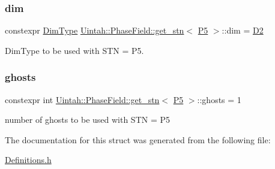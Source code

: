 \subsubsection{\texorpdfstring{dim}{dim}}
{\footnotesize\ttfamily constexpr \hyperlink{namespaceUintah_1_1PhaseField_a12bfc68444894dffdf0cb8d9cf0cc76a}{Dim\+Type} \hyperlink{structUintah_1_1PhaseField_1_1get__stn}{Uintah\+::\+Phase\+Field\+::get\+\_\+stn}$<$ \hyperlink{namespaceUintah_1_1PhaseField_a24d833a720598df1020f5cc2e75f8702a218e7fca21085b602c79158a04bc83a0}{P5} $>$\+::dim = \hyperlink{namespaceUintah_1_1PhaseField_a12bfc68444894dffdf0cb8d9cf0cc76aa1a451dae278b0103a94105c8776e9a67}{D2}\hspace{0.3cm}{\ttfamily [static]}}



Dim\+Type to be used with S\+TN = P5. 

\mbox{\label{structUintah_1_1PhaseField_1_1get__stn_3_01P5_01_4_abdc172a7101506a5fc7fa3e5860c5350}} 
\subsubsection{\texorpdfstring{ghosts}{ghosts}}
{\footnotesize\ttfamily constexpr int \hyperlink{structUintah_1_1PhaseField_1_1get__stn}{Uintah\+::\+Phase\+Field\+::get\+\_\+stn}$<$ \hyperlink{namespaceUintah_1_1PhaseField_a24d833a720598df1020f5cc2e75f8702a218e7fca21085b602c79158a04bc83a0}{P5} $>$\+::ghosts = 1\hspace{0.3cm}{\ttfamily [static]}}



number of ghosts to be used with S\+TN = P5 



The documentation for this struct was generated from the following file\+:\begin{DoxyCompactItemize}
\item 
\hyperlink{Definitions_8h}{Definitions.\+h}\end{DoxyCompactItemize}
